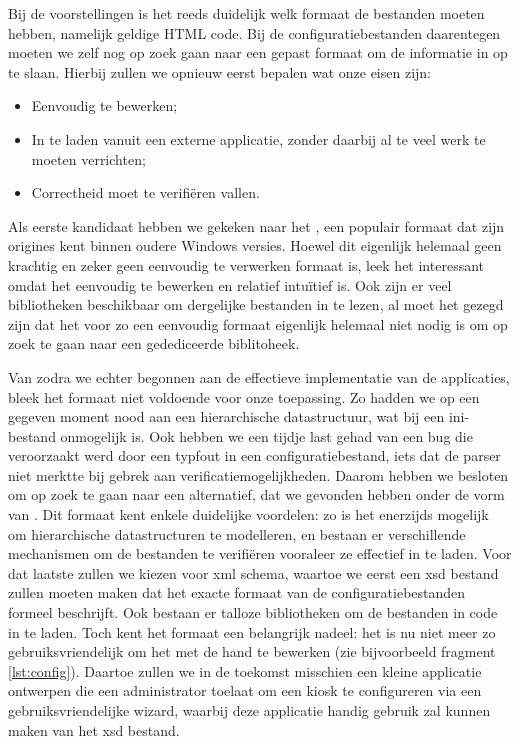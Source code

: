 Bij de voorstellingen is het reeds duidelijk welk formaat de bestanden moeten hebben, namelijk geldige HTML code. Bij de configuratiebestanden daarentegen moeten we zelf nog op zoek gaan naar een gepast formaat om de informatie in op te slaan. Hierbij zullen we opnieuw eerst bepalen wat onze eisen zijn:
\begin{itemize}
  \item Eenvoudig te bewerken;
  \item In te laden vanuit een externe applicatie, zonder daarbij al te veel werk te moeten verrichten;
  \item Correctheid moet te verifiëren vallen.
\end{itemize}

Als eerste kandidaat hebben we gekeken naar het , een populair  formaat dat zijn origines kent binnen oudere Windows versies. Hoewel dit eigenlijk helemaal geen krachtig en zeker geen eenvoudig te verwerken formaat is, leek het interessant omdat het eenvoudig te bewerken en relatief intuïtief is. Ook zijn er veel bibliotheken beschikbaar om dergelijke bestanden in te lezen, al moet het gezegd zijn dat het voor zo een eenvoudig formaat eigenlijk helemaal niet nodig is om op zoek te gaan naar een gedediceerde biblitoheek.

Van zodra we echter begonnen aan de effectieve implementatie van de applicaties, bleek het formaat niet voldoende voor onze toepassing. Zo hadden we op een gegeven moment nood aan een hierarchische datastructuur, wat bij een ini-bestand onmogelijk is. Ook hebben we een tijdje last gehad van een bug die veroorzaakt werd door een typfout in een configuratiebestand, iets dat de parser niet merktte bij gebrek aan verificatiemogelijkheden. Daarom hebben we besloten om op zoek te gaan naar een alternatief, dat we gevonden hebben onder de vorm van . Dit formaat kent enkele duidelijke voordelen: zo is het enerzijds mogelijk om hierarchische datastructuren te modelleren, en bestaan er verschillende mechanismen om de bestanden te verifiëren vooraleer ze effectief in te laden. Voor dat laatste zullen we kiezen voor \ac{xml} schema, waartoe we eerst een \ac{xsd} bestand zullen moeten maken dat het exacte formaat van de configuratiebestanden formeel beschrijft. Ook bestaan er talloze bibliotheken om de bestanden in code in te laden. Toch kent het formaat een belangrijk nadeel: het is nu niet meer zo gebruiksvriendelijk om het met de hand te bewerken (zie bijvoorbeeld fragment \ref{lst:config}). Daartoe zullen we in de toekomst misschien een kleine applicatie ontwerpen die een administrator toelaat om een kiosk te configureren via een gebruiksvriendelijke wizard, waarbij deze applicatie handig gebruik zal kunnen maken van het \ac{xsd} bestand. 

